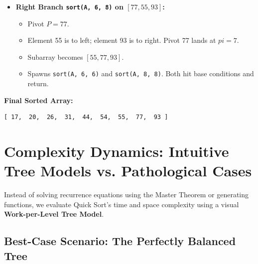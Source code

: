 \documentclass[10pt,journal,compsoc,onecolumn]{IEEEtran}
\begin{document}
\begin{itemize}
    \item \textbf{Right Branch \texttt{sort(A, 6, 8)} on $[77, 55, 93]$:}
    \begin{itemize}
        \item Pivot $P = 77$.
        \item Element 55 is to left; element 93 is to right. Pivot 77 lands at $pi = 7$.
        \item Subarray becomes $[55, 77, 93]$.
        \item Spawns \texttt{sort(A, 6, 6)} and \texttt{sort(A, 8, 8)}. Both hit base conditions and return.
    \end{itemize}
\end{itemize}

\textbf{Final Sorted Array:}
\begin{verbatim}
[ 17,  20,  26,  31,  44,  54,  55,  77,  93 ]
\end{verbatim}

\section{Complexity Dynamics: Intuitive Tree Models vs. Pathological Cases}
\label{sec:complexity}

Instead of solving recurrence equations using the Master Theorem or generating functions, we evaluate Quick Sort's time and space complexity using a visual \textbf{Work-per-Level Tree Model}.

\subsection{Best-Case Scenario: The Perfectly Balanced Tree}
\end{document}
